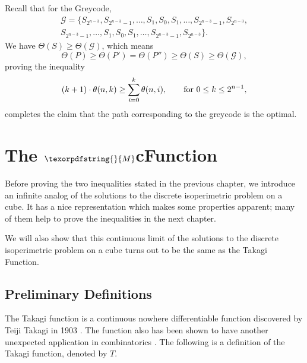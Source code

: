 \documentclass[12pt]{ucthesis}
\theoremstyle{plain}
\theoremstyle{definition}
\newcommand{\takagi}{
  \texorpdfstring{\protect}{M}
}
\begin{document}
Recall that for the Greycode,
\begin{align*}
\mathcal{G} = \{S_{2^{n - 3}}, S_{2^{n - 3} - 1}, \dots, S_1, S_0, S_1,
\dots, S_{2^{n - 3} - 1}, S_{2^{n - 3}}, \\
S_{2^{n - 3} - 1}, \dots, S_1, S_0, S_1, \dots, S_{2^{n - 3} - 1}, S_{2^{n - 3}}\}.
\end{align*}
We have $\Theta(S) \ge \Theta(\mathcal{G})$, which means
\begin{equation*}
\Theta(P) \ge \Theta(P') = \Theta(P'') \ge \Theta(S) \ge \Theta(\mathcal{G}),
\end{equation*}
proving the inequality
\begin{equation}
\label{Equation 2.4}
(k + 1) \cdot \theta(n, k) \ge \sum_{i = 0}^k \theta(n, i),
\qquad \textnormal{for } 0 \le k \le 2^{n - 1},
\end{equation}
completes the claim that the path corresponding to the greycode is the optimal.

\chapter{The $\takagi$cFunction}
\label{Chapter 3}

Before proving the two inequalities stated in the previous chapter,
we introduce an infinite analog of the solutions to the discrete isoperimetric problem on a cube.
It has a nice representation which makes some properties apparent;
many of them help to prove the inequalities in the next chapter.

We will also show that this continuous limit of the solutions to
the discrete isoperimetric problem on a cube turns out to be the same as the Takagi Function.

\section{Preliminary Definitions}
\label{Section 3.1}

The Takagi function is a continuous nowhere differentiable function
discovered by Teiji Takagi in 1903 \cite{Takagi.1973}.
The function also has been shown to have another unexpected application in combinatorics \cite{Frankl.1995}.
The following is a definition of the Takagi function, denoted by $T$.
\end{document}
